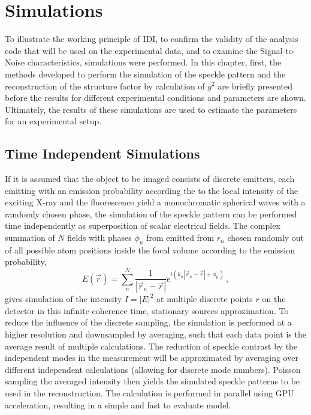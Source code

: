 \chapter{Simulations}
\label{chap:simulation}


To illustrate the working principle of IDI, to confirm the validity of the analysis code that will be used on the experimental data, and to examine the Signal-to-Noise characteristics, simulations were performed.
In this chapter, first, the methods developed to perform the simulation of the speckle pattern and the reconstruction of the structure factor by calculation of $g^2$ are briefly presented before the results for different experimental conditions and parameters are shown. Ultimately, the results of these simulations are used to estimate the parameters for an experimental setup.

\section{Time Independent Simulations}
If it is assumed that the object to be imaged consists of discrete emitters, each emitting with an emission probability according the to the local intensity of the exciting X-ray and the fluorescence yield a monochromatic spherical waves with a randomly chosen phase, the simulation of the speckle pattern can be performed time independently as superposition of scalar electrical fields.  The complex summation of $N$ fields with phases $\phi_n$ from  emitted from $r_n$ chosen randomly out of all possible atom positions inside the focal volume according to the emission probability,
\begin{equation}
E(\vec{r})=\sum_n^N \frac{1}{\left|\vec{r}_n-\vec{r}\right|} e^{i(k_n{\left|\vec{r}_n-\vec{r}\right|}+\phi_n)} \,,
\end{equation}
gives simulation of the intensity $I=\left|E\right|^2$ at multiple discrete points $r$ on the  detector in this infinite coherence time, stationary sources approximation.  To reduce the influence of the discrete sampling, the simulation is performed at a higher resolution and downsampled by averaging, such that each data point is the average result of multiple calculations. The reduction of speckle contrast by the independent modes in the measurement will be approximated by averaging over different independent calculations (allowing for discrete mode numbers). Poisson sampling the averaged intensity then yields the simulated speckle patterns to be used in the reconstruction. 
The calculation is performed in parallel using GPU acceleration, resulting in a simple and fast to evaluate model. 


